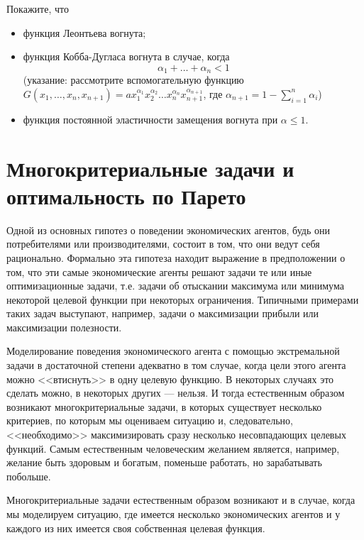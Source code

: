 \begin{exer}
    Покажите, что
  \begin{itemize}
      \item функция Леонтьева вогнута;

      \item функция Кобба-Дугласа вогнута в случае, когда
\[
    \alpha_{1}+\ldots+\alpha_{n}<1
\]
      (указание: рассмотрите вспомогательную функцию
      $G(x_{1},\ldots,x_{n},x_{n+1})
      =ax_{1}^{\alpha_{1}}x_{2}^{\alpha_{2}}\ldots
      x_{n}^{\alpha_{n}}x_{n+1}^{\alpha_{n+1}}$,
      где $\alpha_{n+1}=1-\sum_{i=1}^{n}\alpha_{i}$)
    \item функция постоянной эластичности замещения вогнута при $\alpha\leq1$.
  \end{itemize}
\end{exer}






\section{Многокритериальные задачи и оптимальность по Парето}



    Одной из основных гипотез о поведении экономических агентов,
    будь они потребителями или производителями, состоит в том, что они ведут себя
    рационально. Формально эта гипотеза находит выражение в предположении о том, что эти
    самые экономические агенты решают задачи те или иные оптимизационные задачи, т.е. задачи
    об отыскании максимума или минимума некоторой целевой функции при некоторых ограничения.
    Типичными примерами таких задач выступают, например, задачи о максимизации прибыли или
    максимизации полезности.

    Моделирование поведения экономического агента с помощью экстремальной задачи в
    достаточной степени адекватно в том случае, когда цели этого агента можно <<втиснуть>> в
    одну целевую функцию. В некоторых случаях это сделать можно, в некоторых других ---
    нельзя. И тогда естественным образом возникают многокритериальные задачи, в которых
    существует несколько критериев, по которым мы оцениваем ситуацию и, следовательно,
    <<необходимо>> максимизировать сразу несколько несовпадающих целевых функций. Самым естественным
    человеческим желанием является, например, желание быть здоровым и богатым, поменьше
    работать, но зарабатывать побольше.

    Многокритериальные задачи естественным образом возникают и в случае, когда мы моделируем
    ситуацию, где имеется несколько экономических агентов и у каждого из них имеется
    своя собственная целевая функция.

